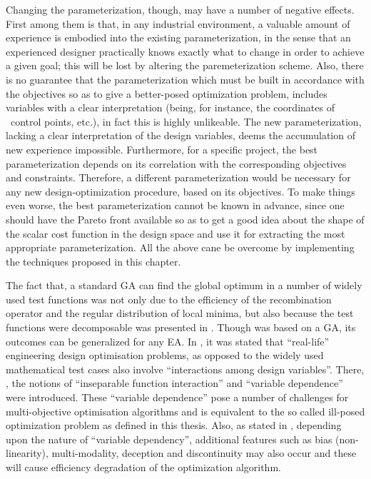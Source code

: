 Changing the parameterization, though, may have a number of negative effects. First among them is that, in any industrial environment, a valuable amount of experience is embodied into the existing parameterization, in the sense that an experienced designer practically knows exactly what to change in order to achieve a given goal; this will be lost by altering the paremeterization scheme. Also, there is no guarantee that the parameterization which must be built in accordance with the objectives so as to give a better-posed optimization problem, includes variables with a clear interpretation (being, for instance, the coordinates of \Bezier\ control points, etc.), in fact this is highly unlikeable. The new parameterization, lacking a clear interpretation of the design variables, deems the accumulation of new experience impossible. Furthermore, for a specific project, the best parameterization depends on its correlation with the corresponding  objectives and constraints. Therefore, a different parameterization would be necessary for any new design-optimization procedure, based on its objectives. To make things even worse, the best parameterization cannot be known in advance, since one should have the Pareto front available so as to get a good idea about the shape of the scalar cost function in the design space and use it for extracting the most appropriate parameterization. All the above cane be overcome by implementing the techniques proposed in this chapter.                 


The fact that, a standard GA can find the global optimum in a number of widely used test functions was not only due to the efficiency of the recombination operator and the regular distribution of local minima, but also because the test functions were decomposable was presented in \cite{Salomon}. Though \citep{Salomon} was based on a GA, its outcomes can be generalized for any EA. In \cite{Roy_2002a,Roy_2002b},  it was stated that ``real-life'' engineering design optimisation problems, as opposed to the widely used mathematical test cases also involve ``interactions among design variables''. There, \cite{Roy_2002a,Roy_2002b}, the notions of ``inseparable function interaction'' and ``variable dependence'' were introduced. These ``variable dependence'' pose a number of challenges for multi-objective optimisation algorithms and is equivalent to the so called ill-posed optimization problem as defined in this thesis.
Also, as stated in \cite{Roy_2002b}, depending upon the nature of ``variable dependency'', additional features such as bias (non-linearity), multi-modality, deception and discontinuity may also occur and these will cause efficiency degradation of the optimization algorithm. 


